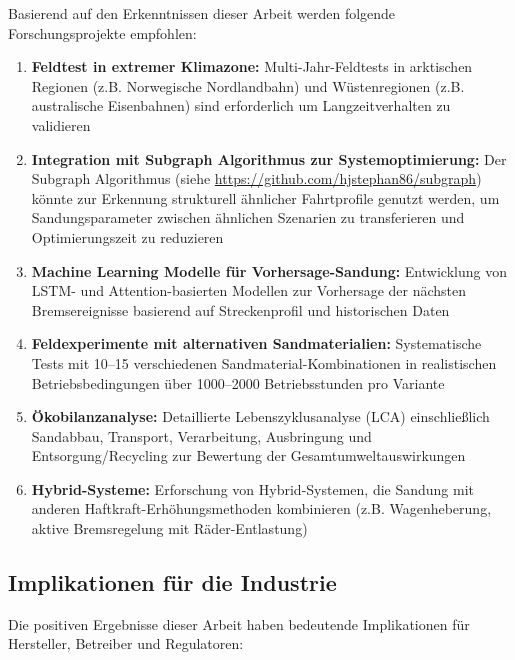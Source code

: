 \documentclass[a4paper,12pt]{article}
\theoremstyle{definition}
\theoremstyle{remark}
\begin{document}
Basierend auf den Erkenntnissen dieser Arbeit werden folgende Forschungsprojekte empfohlen:

\begin{enumerate}
	\item \textbf{Feldtest in extremer Klimazone:} Multi-Jahr-Feldtests in arktischen Regionen (z.B. Norwegische Nordlandbahn) und Wüstenregionen (z.B. australische Eisenbahnen) sind erforderlich um Langzeitverhalten zu validieren
	
	\item \textbf{Integration mit Subgraph Algorithmus zur Systemoptimierung:} Der Subgraph Algorithmus (siehe \url{https://github.com/hjstephan86/subgraph}) könnte zur Erkennung strukturell ähnlicher Fahrtprofile genutzt werden, um Sandungsparameter zwischen ähnlichen Szenarien zu transferieren und Optimierungszeit zu reduzieren
	
	\item \textbf{Machine Learning Modelle für Vorhersage-Sandung:} Entwicklung von LSTM- und Attention-basierten Modellen zur Vorhersage der nächsten Bremsereignisse basierend auf Streckenprofil und historischen Daten
	
	\item \textbf{Feldexperimente mit alternativen Sandmaterialien:} Systematische Tests mit 10--15 verschiedenen Sandmaterial-Kombinationen in realistischen Betriebsbedingungen über 1000--2000 Betriebsstunden pro Variante
	
	\item \textbf{Ökobilanzanalyse:} Detaillierte Lebenszyklusanalyse (LCA) einschließlich Sandabbau, Transport, Verarbeitung, Ausbringung und Entsorgung/Recycling zur Bewertung der Gesamtumweltauswirkungen
	
	\item \textbf{Hybrid-Systeme:} Erforschung von Hybrid-Systemen, die Sandung mit anderen Haftkraft-Erhöhungsmethoden kombinieren (z.B. Wagenheberung, aktive Bremsregelung mit Räder-Entlastung)
\end{enumerate}

\subsection{Implikationen für die Industrie}

Die positiven Ergebnisse dieser Arbeit haben bedeutende Implikationen für Hersteller, Betreiber und Regulatoren:
\end{document}
